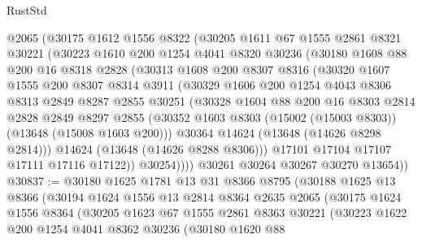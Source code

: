 \begin{lexlean}{RustStd}
\begin{coremodule}
        @2065
        (@30175
          @1612
          @1556
          @8322
          (@30205
            @1611
            @67
            @1555
            @2861
            @8321
            @30221
            (@30223
              @1610
              @200
              @1254
              @4041
              @8320
              @30236
              (@30180
                @1608
                @88
                @200
                @16
                @8318
                @2828
                (@30313
                  @1608
                  @200
                  @8307
                  @8316
                  (@30320
                    @1607
                    @1555
                    @200
                    @8307
                    @8314
                    @3911
                    (@30329
                      @1606
                      @200
                      @1254
                      @4043
                      @8306
                      @8313
                      @2849
                      @8287
                      @2855
                      @30251
                      (@30328
                        @1604
                        @88
                        @200
                        @16
                        @8303
                        @2814
                        @2828
                        @2849
                        @8297
                        @2855
                        (@30352 @1603 @8303 (@15002 (@15003 @8303)) (@13648 (@15008 @1603 @200)))
                        @30364
                        @14624
                        (@13648 (@14626 @8298 @2814)))
                      @14624
                      (@13648 (@14626 @8288 @8306)))
                    @17101
                    @17104
                    @17107
                    @17111
                    @17116
                    @17122))
                @30254))))
        @30261
        @30264
        @30267
        @30270
        @13654))
@30837 := @30180
    @1625
    @1781
    @13
    @31
    @8366
    @8795
    (@30188
      @1625
      @13
      @8366
      (@30194
        @1624
        @1556
        @13
        @2814
        @8364
        @2635
        @2065
        (@30175
          @1624
          @1556
          @8364
          (@30205
            @1623
            @67
            @1555
            @2861
            @8363
            @30221
            (@30223
              @1622
              @200
              @1254
              @4041
              @8362
              @30236
              (@30180
                @1620
                @88

\end{coremodule}
\end{lexlean}
